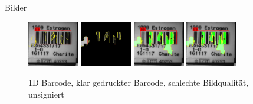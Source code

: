 \documentclass{beamer}
\begin{document}
  \begin{frame}{Bilder}
    \begin{figure}
      \includegraphics[width=0.2\textwidth]{./assets/E2017064331P1-A-7_IH-PR_0000000000003277-label_top1_positiveonlywithrest.jpg}
      \hfill
      \includegraphics[width=0.2\textwidth]{./assets/E2017064331P1-A-7_IH-PR_0000000000003277-label_top1_positiveonly.jpg}
      \hfill
      \includegraphics[width=0.2\textwidth]{./assets/E2017064331P1-A-7_IH-PR_0000000000003277-label_top1_proscons.jpg}
      \hfill
      \includegraphics[width=0.2\textwidth]{./assets/E2017064331P1-A-7_IH-PR_0000000000003277-label_top1_prosconsminweight.jpg}
      \caption{1D Barcode, klar gedruckter Barcode, schlechte Bildqualität, unsigniert}
    \end{figure}
  \end{frame}
\end{document}
